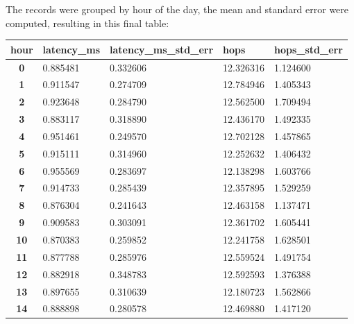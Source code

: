 \documentclass[a4paper,10pt]{article}
\begin{document}
The records were grouped by hour of the day, the mean and standard error were computed, resulting in this final table:


\begin{table}[h!]
\centering

\begin{tabular}{|c|l|l|l|l|}
\hline
\multicolumn{1}{|l|}{hour} & latency\_ms & latency\_ms\_std\_err & hops      & hops\_std\_err \\ \hline
\textbf{0}                 & 0.885481    & 0.332606              & 12.326316 & 1.124600       \\ \hline
\textbf{1}                 & 0.911547    & 0.274709              & 12.784946 & 1.405343       \\ \hline
\textbf{2}                 & 0.923648    & 0.284790              & 12.562500 & 1.709494       \\ \hline
\textbf{3}                 & 0.883117    & 0.318890              & 12.436170 & 1.492335       \\ \hline
\textbf{4}                 & 0.951461    & 0.249570              & 12.702128 & 1.457865       \\ \hline
\textbf{5}                 & 0.915111    & 0.314960              & 12.252632 & 1.406432       \\ \hline
\textbf{6}                 & 0.955569    & 0.283697              & 12.138298 & 1.603766       \\ \hline
\textbf{7}                 & 0.914733    & 0.285439              & 12.357895 & 1.529259       \\ \hline
\textbf{8}                 & 0.876304    & 0.241643              & 12.463158 & 1.137471       \\ \hline
\textbf{9}                 & 0.909583    & 0.303091              & 12.361702 & 1.605441       \\ \hline
\textbf{10}                & 0.870383    & 0.259852              & 12.241758 & 1.628501       \\ \hline
\textbf{11}                & 0.877788    & 0.285976              & 12.559524 & 1.491754       \\ \hline
\textbf{12}                & 0.882918    & 0.348783              & 12.592593 & 1.376388       \\ \hline
\textbf{13}                & 0.897655    & 0.310639              & 12.180723 & 1.562866       \\ \hline
\textbf{14}                & 0.888898    & 0.280578              & 12.469880 & 1.417120       \\ \hline

\end{tabular}
\end{table}
\end{document}
